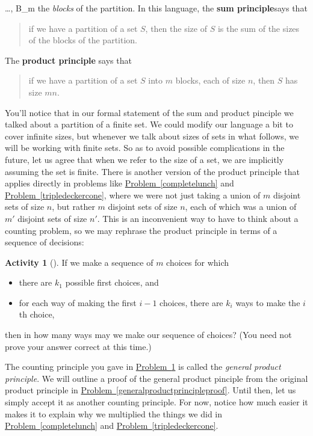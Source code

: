 \documentclass[10pt,]{book}
\newcommand{\terminology}[1]{\textbf{#1}}
\theoremstyle{plain}
\theoremstyle{definition}
\newtheorem{activity}[project]{Activity}
\numberwithin{equation}{chapter}
\begin{document}
\ldots, B_m\) the \emph{blocks} of the partition. In this language, the \terminology{sum principle}says that%
\begin{quote}\hypertarget{blockquote-1}{}
if we have a partition of a set \(S\), then the size of \(S\) is the sum of the sizes of the blocks of the partition.\end{quote}
The \terminology{product principle} says that%
\begin{quote}\hypertarget{blockquote-2}{}
if we have a partition of a set \(S\) into \(m\) blocks, each of size \(n\), then \(S\) has size \(mn\).\end{quote}
You'll notice that in our formal statement of the sum and product pinciple we talked about a partition of a finite set. We could modify our language a bit to cover infinite sizes, but whenever we talk about sizes of sets in what follows, we will be working with finite sets. So as to avoid possible complications in the future, let us agree that when we refer to the size of a set, we are implicitly assuming the set is finite. There is another version of the product principle that applies directly in problems like \hyperref[completelunch]{Problem~\ref{completelunch}} and \hyperref[tripledeckercone]{Problem~\ref{tripledeckercone}}, where we were not just taking a union of \(m\) disjoint sets of size \(n\), but rather \(m\) disjoint sets of size \(n\), each of which was a union of \(m'\) disjoint sets of size \(n'\). This is an inconvenient way to have to think about a counting problem, so we may rephrase the product principle in terms of a sequence of decisions:%
\begin{activity}[]\label{generalproductprincipleintro}
If we make a sequence of \(m\) choices for which \leavevmode%
\begin{itemize}[label=\textbullet]
\item{}there are \(k_1\) possible first choices, and%
\item{}for each way of making the first \(i-1\) choices, there are \(k_i\) ways to make the \(i\)th choice,%
\end{itemize}
 then in how many ways may we make our sequence of choices? (You need not prove your answer correct at this time.)%
\end{activity}
The counting principle you gave in \hyperref[generalproductprincipleintro]{Problem~\ref{generalproductprincipleintro}} is called the \emph{general product principle}. We will outline a proof of the general product pinciple from the original product principle in \hyperref[generalproductprincipleproof]{Problem~\ref{generalproductprincipleproof}}. Until then, let us simply accept it as another counting principle. For now, notice how much easier it makes it to explain why we multiplied the things we did in \hyperref[completelunch]{Problem~\ref{completelunch}} and \hyperref[tripledeckercone]{Problem~\ref{tripledeckercone}}.%
\end{document}

